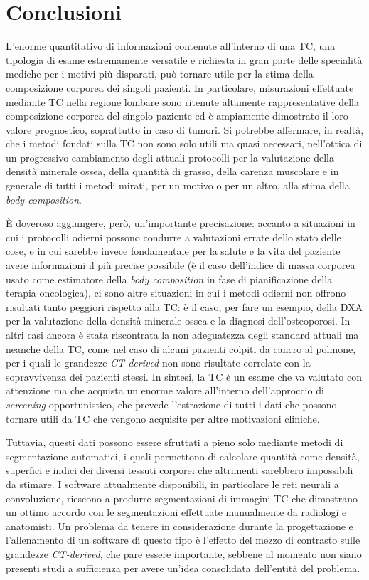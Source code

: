 \chapter*{Conclusioni}
L'enorme quantitativo di informazioni contenute all'interno di una TC, una tipologia di esame estremamente versatile e richiesta in gran parte delle specialità mediche per i motivi più disparati, può tornare utile per la stima della composizione corporea dei singoli pazienti. In particolare, misurazioni effettuate mediante TC nella regione lombare sono ritenute altamente rappresentative della composizione corporea del singolo paziente ed è ampiamente dimostrato il loro valore prognostico, soprattutto in caso di tumori. Si potrebbe affermare, in realtà, che i metodi fondati sulla TC non sono solo utili ma quasi necessari, nell'ottica di un progressivo cambiamento degli attuali protocolli per la valutazione della densità minerale ossea, della quantità di grasso, della carenza muscolare e in generale di tutti i metodi mirati, per un motivo o per un altro, alla stima della \textit{body composition}.

È doveroso aggiungere, però, un'importante precisazione: accanto a situazioni in cui i protocolli odierni possono condurre a valutazioni errate dello stato delle cose, e in cui sarebbe invece fondamentale per la salute e la vita del paziente avere informazioni il più precise possibile (è il caso dell'indice di massa corporea usato come estimatore della \textit{body composition} in fase di pianificazione della terapia oncologica), ci sono altre situazioni in cui i metodi odierni non offrono risultati tanto peggiori rispetto alla TC: è il caso, per fare un esempio, della DXA per la valutazione della densità minerale ossea e la diagnosi dell'osteoporosi. In altri casi ancora è stata riscontrata la non adeguatezza degli standard attuali ma neanche della TC, come nel caso di alcuni pazienti colpiti da cancro al polmone, per i quali le grandezze \textit{CT-derived} non sono risultate correlate con la sopravvivenza dei pazienti stessi. In sintesi, la TC è un esame che va valutato con attenzione ma che acquista un enorme valore all'interno dell'approccio di \textit{screening} opportunistico, che prevede l'estrazione di tutti i dati che possono tornare utili da TC che vengono acquisite per altre motivazioni cliniche.

Tuttavia, questi dati possono essere sfruttati a pieno solo mediante metodi di segmentazione automatici, i quali permettono di calcolare quantità come densità, superfici e indici dei diversi tessuti corporei che altrimenti sarebbero impossibili da stimare. I software attualmente disponibili, in particolare le reti neurali a convoluzione, riescono a produrre segmentazioni di immagini TC che dimostrano un ottimo accordo con le segmentazioni effettuate manualmente da radiologi e anatomisti. Un problema da tenere in considerazione durante la progettazione e l'allenamento di un software di questo tipo è l'effetto del mezzo di contrasto sulle grandezze \textit{CT-derived}, che pare essere importante, sebbene al momento non siano presenti studi a sufficienza per avere un'idea consolidata dell'entità del problema.

